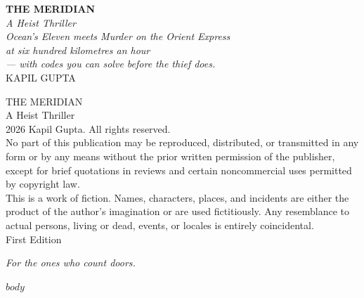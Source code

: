 \documentclass[11pt,twoside,openany]{book}
\begin{document}
\begin{titlepage}
\thispagestyle{empty}
\begin{center}
\vspace*{2.6in}
{\Huge\bfseries\MakeUppercase{The Meridian}}\\[0.35in]
{\large\itshape A Heist Thriller}\\[0.25in]
{\small\itshape Ocean's Eleven meets Murder on the Orient Express\\at six hundred kilometres an hour\\--- with codes you can solve before the thief does.}\\[2.5in]
{\Large\MakeUppercase{Kapil Gupta}}
\end{center}
\end{titlepage}

\newpage
\thispagestyle{empty}
\vspace*{2in}
\begin{footnotesize}
\noindent THE MERIDIAN\\
A Heist Thriller\\
\textcopyright{} 2026 Kapil Gupta. All rights reserved.\\[0.15in]
No part of this publication may be reproduced, distributed, or transmitted in any form or by any means without the prior written permission of the publisher, except for brief quotations in reviews and certain noncommercial uses permitted by copyright law.\\[0.15in]
This is a work of fiction. Names, characters, places, and incidents are either the product of the author's imagination or are used fictitiously. Any resemblance to actual persons, living or dead, events, or locales is entirely coincidental.\\[0.15in]
First Edition
\end{footnotesize}

\newpage
\thispagestyle{empty}
\vspace*{5in}
\begin{center}\itshape For the ones who count doors.\end{center}

\newpage
\pagestyle{empty}
\begingroup
\titlespacing*{\chapter}{0pt}{0pt}{0.4in}
\tableofcontents
\endgroup

\mainmatter

$body$
\end{document}
